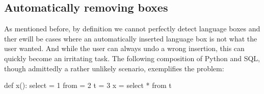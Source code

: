 \documentclass[sigplan,screen]{acmart}\settopmatter{printfolios=true,printccs=false,printacmref=false}
\begin{document}

\subsection{Automatically removing boxes}
\label{subsec_autoremoval}

As mentioned before, by definition we cannot perfectly detect language boxes
and ther ewill be cases where an automatically inserted language box is not
what the user wanted.
And while the user can always undo a wrong insertion,
this can quickly become an irritating task.
The following composition of Python and
SQL, though admittedly a rather unlikely scenario, exemplifies the problem:

\begin{lstdefault}[language=Python]
  def x():
    select = 1
    from = 2
    t = 3
    x = select * from t
\end{lstdefault}
\vspace{1em}
\end{document}
